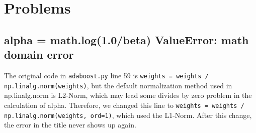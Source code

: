 \documentclass{article}[12pt, twocolumn]
\begin{document}
\section{Problems}
\subsection{alpha = math.log(1.0/beta) ValueError: math domain error}
The original code in \texttt{adaboost.py} line 59 is 
\texttt{weights = weights / np.linalg.norm(weights)},
but the default normalization method used in np.linalg.norm is L2-Norm, 
which may lead some divides by zero problem in the calculation of alpha.
Therefore, we changed this line to \texttt{weights = weights / np.linalg.norm(weights, ord=1)}, 
which used the L1-Norm. After this change, the error in the title never shows up again.

\subsection{}
\end{document}
